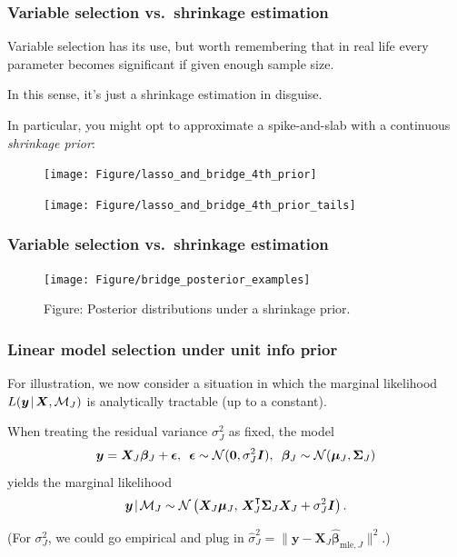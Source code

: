 \documentclass[18pt]{beamer}
\newcommand{\defineTightSpacing}{%
	\setlength{\abovedisplayskip}{.25\baselineskip}%
	\setlength{\belowdisplayskip}{.25\baselineskip}%
}
\newcommand{\given}{\mskip.7\thinmuskip | \mskip.7\thinmuskip}
\newcommand{\transpose}{\text{\raisebox{.5ex}{$\intercal$}}}
\newcommand{\normalDist}{\operatorname{\mathcal{N}}}
\newcommand{\likelihood}{L}
\newcommand{\by}{\bm{y}}
\newcommand{\bX}{\bm{X}}
\newcommand{\bmu}{\bm{\mu}}
\newcommand{\bbeta}{\bm{\beta}}
\newcommand{\bSigma}{\bm{\Sigma}}
\newcommand{\model}{\mathcal{M}}
\newcommand{\nonzeroCoefSet}{J}
\begin{document}
\begin{frame}
\frametitle{Variable selection vs.\ shrinkage estimation}
\pause
Variable selection has its use, but worth remembering that in real life every parameter becomes significant if given enough sample size.

\pause
In this sense, it's just a shrinkage estimation in disguise. 

\pause
In particular, you might opt to approximate a spike-and-slab with a continuous \textit{shrinkage prior}:

\vspace{-.3\baselineskip}
	\begin{figure}
		\begin{minipage}{.48\linewidth}
		\texttt{[image: Figure/lasso\_and\_bridge\_4th\_prior]}
		\end{minipage}
		\begin{minipage}{.48\linewidth}
			\texttt{[image: Figure/lasso\_and\_bridge\_4th\_prior\_tails]}
		\end{minipage}
	\end{figure} \vspace{-.3\baselineskip}

\end{frame}


\begin{frame}
\frametitle{Variable selection vs.\ shrinkage estimation}
\begin{figure}
\texttt{[image: Figure/bridge\_posterior\_examples]}
\caption*{\textcolor{themecolor}{Figure:}
	Posterior distributions under a shrinkage prior.
}
\end{figure}
\end{frame}


\begin{frame}
\frametitle{Linear model selection under unit info prior}
For illustration, we now consider a situation in which the marginal likelihood $\likelihood(\by \given \bX,  \model_\nonzeroCoefSet)$ is analytically tractable (up to a constant).

\pause
\smallskip
When treating the residual variance $\sigma_\nonzeroCoefSet^2$ as fixed, the model
\begin{equation*} \defineTightSpacing%
\by = \bX_\nonzeroCoefSet \bbeta_\nonzeroCoefSet + \bm{\epsilon}, \ \,
\bm{\epsilon} \sim \normalDist(\bm{0}, \sigma_\nonzeroCoefSet^2 \bm{I}), \ \,
\bbeta_\nonzeroCoefSet \sim \normalDist(\bmu_\nonzeroCoefSet, \bSigma_\nonzeroCoefSet)
\end{equation*}
\pause
yields the marginal likelihood
\begin{equation*} \defineTightSpacing%
\by \given \model_\nonzeroCoefSet \sim \normalDist\left(
	\bX_\nonzeroCoefSet \bmu_\nonzeroCoefSet, \,
	\bX_\nonzeroCoefSet^\transpose \bSigma_\nonzeroCoefSet \bX_\nonzeroCoefSet + \sigma_\nonzeroCoefSet^2 \bm{I}
\right).
\end{equation*}

\pause
(For $\sigma_\nonzeroCoefSet^2$, we could go empirical and plug in $\widehat{\sigma}_\nonzeroCoefSet^2 = \big\| \by - \bX_\nonzeroCoefSet \widehat{\bbeta}_{\textrm{mle}, \nonzeroCoefSet} \big\|^2$.)
\end{frame}
\end{document}
